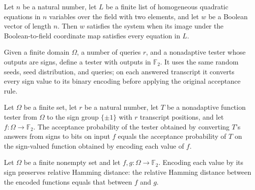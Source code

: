\begin{definition}
\label{FABL.IsBoolHomogeneousQuadraticSystem}
\leanok
{}
Let $n$ be a natural number, let $L$ be a finite list of homogeneous quadratic equations
in $n$ variables over the field with two elements, and let $w$ be a Boolean vector of
length $n$. Then $w$ satisfies the system when its image under the Boolean-to-field
coordinate map satisfies every equation in $L$.
\end{definition}

\begin{definition}
\leanok
{}
Given a finite domain $\Omega$, a number of queries $r$, and a nonadaptive tester whose
outputs are signs, define a tester with outputs in $\mathbb{F}_2$. It uses the same
random seeds, seed distribution, and queries; on each answered transcript it converts
every sign value to its binary encoding before applying the original acceptance rule.
\end{definition}

\begin{theorem}
\leanok
{}
Let $\Omega$ be a finite set, let $r$ be a natural number, let $T$ be a nonadaptive
function tester from $\Omega$ to the sign group $\{\pm1\}$ with $r$ transcript
positions, and let $f:\Omega\to\mathbb F_2$. The acceptance probability of the tester
obtained by converting $T$'s answers from signs to bits on input $f$ equals the
acceptance probability of $T$ on the sign-valued function obtained by encoding each
value of $f$.
\end{theorem}

\begin{theorem}
\label{FABL.relativeHammingDist_signEncode}
\leanok
{}
Let $\Omega$ be a finite nonempty set and let $f,g:\Omega\to\mathbb{F}_2$. Encoding each
value by its sign preserves relative Hamming distance: the relative Hamming distance
between the encoded functions equals that between $f$ and $g$.
\end{theorem}

